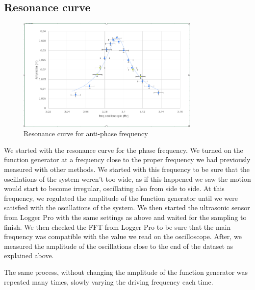 \documentclass{article}
\begin{document}
\subsection{Resonance curve}
\begin{figure}
  \begin{center}
    \includegraphics[width=0.8\textwidth]{lorentz_contro}
  \end{center}
  \label{img:res_contro}
  \caption{Resonance curve for anti-phase frequency}
\end{figure}
We started with the resonance curve for the phase frequency. We turned on the function generator at a frequency close to the proper frequency we had previously measured with other methods. We started with this frequency to be sure that the oscillations of the system weren't too wide, as if this happened we saw the motion would start to become irregular, oscillating also from side to side. At this frequency, we regulated the amplitude of the function generator until we were satisfied with the oscillations of the system. We then started the ultrasonic sensor from Logger Pro with the same settings as above and waited for the sampling to finish. We then checked the FFT from Logger Pro to be sure that the main frequency was compatible with the value we read on the oscilloscope. After, we measured the amplitude of the oscillations close to the end of the dataset as explained above. 

The same process, without changing the amplitude of the function generator was repeated many times, slowly varying the driving frequency each time. 
\end{document}
